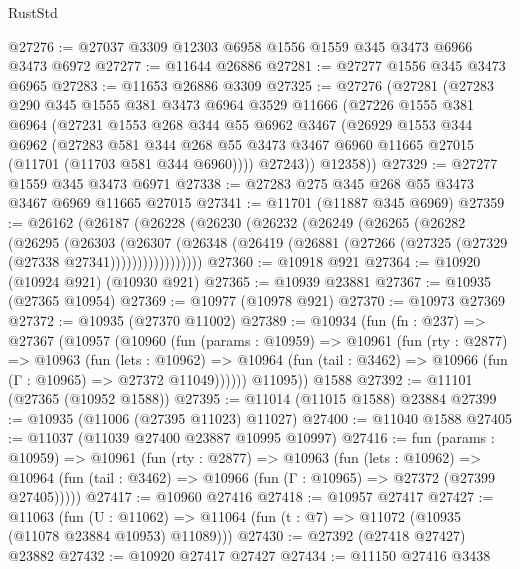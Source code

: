 \begin{lexlean}{RustStd}
\begin{coremodule}
{\begin{coremodule}
{{{{{{{{{{{{{{{{{{{{{{{{{{{{{{{{{{{{{{{{{{{{{{{{{{{{{{{{{{{{{{{{{{{{{{{{{{{{{{{{{{{{{@27276 := @27037 @3309 @12303 @6958 @1556 @1559 @345 @3473 @6966 @3473 @6972
@27277 := @11644 @26886
@27281 := @27277 @1556 @345 @3473 @6965
@27283 := @11653 @26886 @3309
@27325 := @27276
    (@27281
      (@27283
        @290
        @345
        @1555
        @381
        @3473
        @6964
        @3529
        @11666
        (@27226
          @1555
          @381
          @6964
          (@27231
            @1553
            @268
            @344
            @55
            @6962
            @3467
            (@26929
              @1553
              @344
              @6962
              (@27283
                @581
                @344
                @268
                @55
                @3473
                @3467
                @6960
                @11665
                @27015
                (@11701 (@11703 @581 @344 @6960))))
            @27243))
        @12358))
@27329 := @27277 @1559 @345 @3473 @6971
@27338 := @27283 @275 @345 @268 @55 @3473 @3467 @6969 @11665 @27015
@27341 := @11701 (@11887 @345 @6969)
@27359 := @26162
    (@26187
      (@26228
        (@26230
          (@26232
            (@26249
              (@26265
                (@26282
                  (@26295
                    (@26303
                      (@26307
                        (@26348
                          (@26419 (@26881 (@27266 (@27325 (@27329 (@27338 @27341)))))))))))))))))
@27360 := @10918 @921
@27364 := @10920 (@10924 @921) (@10930 @921)
@27365 := @10939 @23881
@27367 := @10935 (@27365 @10954)
@27369 := @10977 (@10978 @921)
@27370 := @10973 @27369
@27372 := @10935 (@27370 @11002)
@27389 := @10934
    (fun (fn : @237) =>
    @27367
      (@10957
        (@10960
          (fun (params : @10959) =>
          @10961
            (fun (rty : @2877) =>
            @10963
              (fun (lets : @10962) =>
              @10964 (fun (tail : @3462) => @10966 (fun (Γ : @10965) => @27372 @11049))))))
        @11095))
    @1588
@27392 := @11101 (@27365 (@10952 @1588))
@27395 := @11014 (@11015 @1588) @23884
@27399 := @10935 (@11006 (@27395 @11023) @11027)
@27400 := @11040 @1588
@27405 := @11037 (@11039 @27400 @23887 @10995 @10997)
@27416 := fun (params : @10959) =>
  @10961
    (fun (rty : @2877) =>
    @10963
      (fun (lets : @10962) =>
      @10964 (fun (tail : @3462) => @10966 (fun (Γ : @10965) => @27372 (@27399 @27405)))))
@27417 := @10960 @27416
@27418 := @10957 @27417
@27427 := @11063
    (fun (U : @11062) => @11064 (fun (t : @7) => @11072 (@10935 (@11078 @23884 @10953) @11089)))
@27430 := @27392 (@27418 @27427) @23882
@27432 := @10920 @27417 @27427
@27434 := @11150 @27416 @3438
}}}}}}}}}}}}}}}}}}}}}}}}}}}}}}}}}}}}}}}}}}}}}}}}}}}}}}}}}}}}}}}}}}}}}}}}}}}}}}}}}}}}}
\end{coremodule}}
\end{coremodule}
\end{lexlean}
